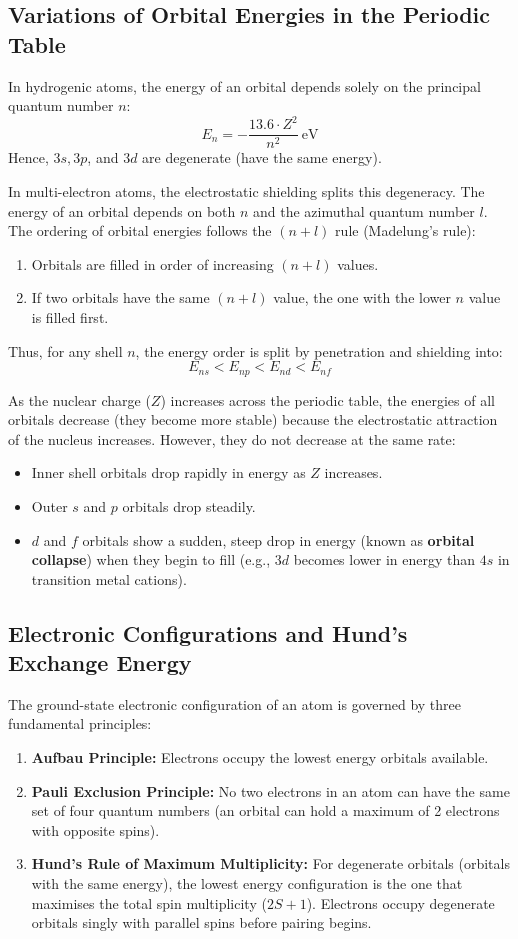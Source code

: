 \documentclass[12pt,a4paper]{article}
\begin{document}
\subsection{Variations of Orbital Energies in the Periodic Table}
In hydrogenic atoms, the energy of an orbital depends solely on the principal quantum number $n$:
\[ E_n = -\frac{13.6 \cdot Z^2}{n^2}\ \text{eV} \]
Hence, $3s, 3p$, and $3d$ are degenerate (have the same energy).

In multi-electron atoms, the electrostatic shielding splits this degeneracy. The energy of an orbital depends on both $n$ and the azimuthal quantum number $l$. The ordering of orbital energies follows the $(n+l)$ rule (Madelung's rule):
\begin{enumerate}
  \item Orbitals are filled in order of increasing $(n+l)$ values.
  \item If two orbitals have the same $(n+l)$ value, the one with the lower $n$ value is filled first.
\end{enumerate}

Thus, for any shell $n$, the energy order is split by penetration and shielding into:
\[ E_{ns} < E_{np} < E_{nd} < E_{nf} \]

As the nuclear charge ($Z$) increases across the periodic table, the energies of all orbitals decrease (they become more stable) because the electrostatic attraction of the nucleus increases. However, they do not decrease at the same rate:
\begin{itemize}[leftmargin=*, itemsep=2pt]
  \item Inner shell orbitals drop rapidly in energy as $Z$ increases.
  \item Outer $s$ and $p$ orbitals drop steadily.
  \item $d$ and $f$ orbitals show a sudden, steep drop in energy (known as \textbf{orbital collapse}) when they begin to fill (e.g., $3d$ becomes lower in energy than $4s$ in transition metal cations).
\end{itemize}

\subsection{Electronic Configurations and Hund's Exchange Energy}
The ground-state electronic configuration of an atom is governed by three fundamental principles:
\begin{enumerate}
  \item \textbf{Aufbau Principle:} Electrons occupy the lowest energy orbitals available.
  \item \textbf{Pauli Exclusion Principle:} No two electrons in an atom can have the same set of four quantum numbers (an orbital can hold a maximum of 2 electrons with opposite spins).
  \item \textbf{Hund's Rule of Maximum Multiplicity:} For degenerate orbitals (orbitals with the same energy), the lowest energy configuration is the one that maximises the total spin multiplicity ($2S+1$). Electrons occupy degenerate orbitals singly with parallel spins before pairing begins.
\end{enumerate}
\end{document}
